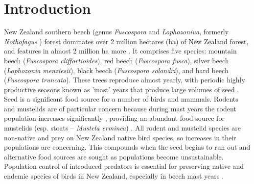 \documentclass[remotesensing,article,submit,moreauthors,pdftex]{Definitions/mdpi}
\begin{document}

\section{Introduction}
New Zealand southern beech (genus \emph{Fuscospora} and \emph{Lophozoniua}, formerly \emph{Nothofagus} \citep{Heenan2013}) forest dominates over 2 million hectares (ha) of New Zealand
forest, and features in almost 2 million ha more \citep{Shepherd2005}. It comprises five species: mountain beech (\emph{Fuscospora cliffortioides}), red
beech (\emph{Fuscospora fusca}), silver beech (\emph{Lophozonia menziesii}), black beech (\emph{Fuscospora solandri}), and hard beech (\emph{Fuscospora truncata}).
These trees reproduce almost yearly, with periodic highly productive seasons known as 'mast' years that produce
large volumes of seed \citep{Wardle1984}. Seed is a significant food source for a number of birds and mammals. Rodents and
mustelids are of particular concern \citep{Elliott2016} because during mast years the rodent population increases
significantly \citep{Elliott2016,Ruscoe2010}, providing an abundant food source for mustelids (esp. stoats -- \emph{Mustela erminea})
\citep{King2011}. All rodent and mustelid species are non-native and prey on New Zealand native bird species, so increases in their populations
are concerning. This compounds when the seed begins to run out and alternative food sources are sought as populations
become unsustainable. Population control of introduced predators is essential for preserving native and endemic species of birds in New Zealand, especially in beech mast years \citep{King2011}.
\end{document}
